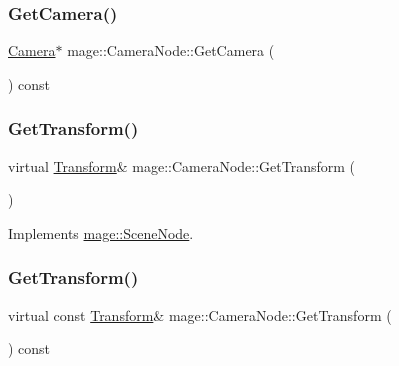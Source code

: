\subsubsection{\texorpdfstring{Get\+Camera()}{GetCamera()}}
{\footnotesize\ttfamily \hyperlink{classmage_1_1_camera}{Camera}$\ast$ mage\+::\+Camera\+Node\+::\+Get\+Camera (\begin{DoxyParamCaption}{ }\end{DoxyParamCaption}) const}

\hypertarget{classmage_1_1_camera_node_a24b0b049d4235df85d61138d74483b02}{}\label{classmage_1_1_camera_node_a24b0b049d4235df85d61138d74483b02} 
\subsubsection{\texorpdfstring{Get\+Transform()}{GetTransform()}\hspace{0.1cm}{\footnotesize\ttfamily [1/2]}}
{\footnotesize\ttfamily virtual \hyperlink{structmage_1_1_transform}{Transform}\& mage\+::\+Camera\+Node\+::\+Get\+Transform (\begin{DoxyParamCaption}{ }\end{DoxyParamCaption})\hspace{0.3cm}{\ttfamily [virtual]}}



Implements \hyperlink{classmage_1_1_scene_node_adbb5020be4054b53efa3682e71f9e6f1}{mage\+::\+Scene\+Node}.

\hypertarget{classmage_1_1_camera_node_a3465efde7535f4aebe7b371f5feeae14}{}\label{classmage_1_1_camera_node_a3465efde7535f4aebe7b371f5feeae14} 
\subsubsection{\texorpdfstring{Get\+Transform()}{GetTransform()}\hspace{0.1cm}{\footnotesize\ttfamily [2/2]}}
{\footnotesize\ttfamily virtual const \hyperlink{structmage_1_1_transform}{Transform}\& mage\+::\+Camera\+Node\+::\+Get\+Transform (\begin{DoxyParamCaption}{ }\end{DoxyParamCaption}) const\hspace{0.3cm}{\ttfamily [virtual]}}



